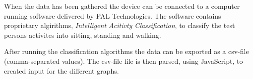 When the data has been gathered the device can be connected to a computer running software delivered by PAL Technologies. The software contains proprietary algirithms, \emph{Intelligent Acitivty Classification}, to classify the test persons activites into sitting, standing and walking.


After running the classification algorithms the data can be exported as a csv-file (comma-separated values). The csv-file file is then parsed, using JavaScript, to created input for the different graphs.
